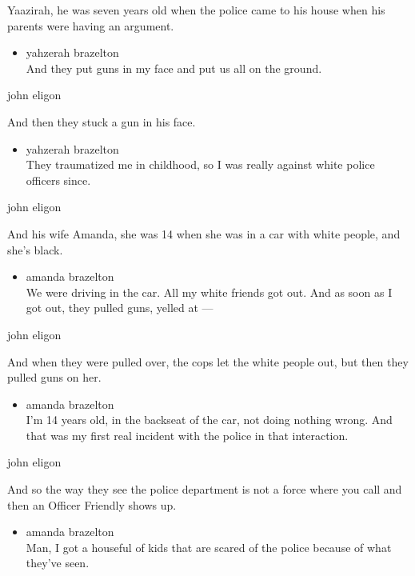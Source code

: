 Yaazirah, he was seven years old when the police came to his house when
his parents were having an argument.

\begin{itemize}
\tightlist
\item
  yahzerah brazelton\\
  And they put guns in my face and put us all on the ground.
\end{itemize}

john eligon

And then they stuck a gun in his face.

\begin{itemize}
\tightlist
\item
  yahzerah brazelton\\
  They traumatized me in childhood, so I was really against white police
  officers since.
\end{itemize}

john eligon

And his wife Amanda, she was 14 when she was in a car with white people,
and she's black.

\begin{itemize}
\tightlist
\item
  amanda brazelton\\
  We were driving in the car. All my white friends got out. And as soon
  as I got out, they pulled guns, yelled at ---
\end{itemize}

john eligon

And when they were pulled over, the cops let the white people out, but
then they pulled guns on her.

\begin{itemize}
\tightlist
\item
  amanda brazelton\\
  I'm 14 years old, in the backseat of the car, not doing nothing wrong.
  And that was my first real incident with the police in that
  interaction.
\end{itemize}

john eligon

And so the way they see the police department is not a force where you
call and then an Officer Friendly shows up.

\begin{itemize}
\tightlist
\item
  amanda brazelton\\
  Man, I got a houseful of kids that are scared of the police because of
  what they've seen.
\end{itemize}

